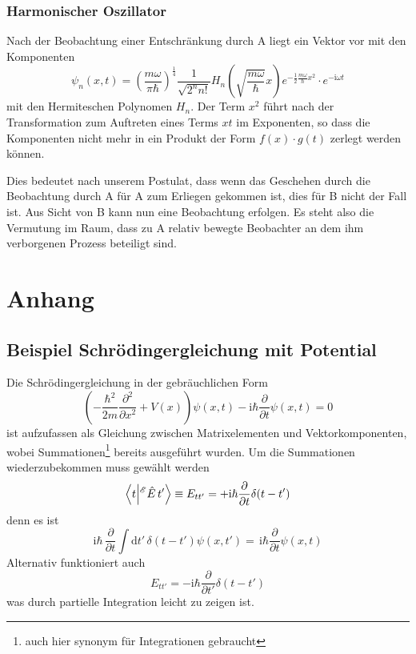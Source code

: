 \documentclass[12pt]{article}
\begin{document}
\subsubsection{Harmonischer Oszillator}

Nach der Beobachtung einer Entschränkung durch A liegt ein Vektor vor mit den Komponenten 
\begin{equation*}
\psi _{n}(x,t)=\left({\frac {m\omega }{\pi \hbar }}\right)^{\frac {1}{4}}{\frac {1}{\sqrt {2^{n}n!}}}H_{n}\left({\sqrt {\frac {m\omega }{\hbar }}}x\right)e^{-{\frac {1}{2}}{\frac {m\omega }{\hbar }}x^{2}} \cdot e^{-\mathrm{i}\omega t}
\end{equation*}
mit den Hermiteschen Polynomen $H_n$. Der Term $x^2$ führt nach der Transformation zum Auftreten eines Terms $xt$ im Exponenten, so dass die Komponenten nicht mehr in ein Produkt der Form $f(x) \cdot g(t)$ zerlegt werden können.

Dies bedeutet nach unserem Postulat, dass wenn das Geschehen durch die Beobachtung durch A für A zum Erliegen gekommen ist, dies für B nicht der Fall ist. Aus Sicht von B kann nun eine Beobachtung erfolgen. Es steht also die Vermutung im Raum, dass zu A relativ bewegte Beobachter an dem ihm verborgenen Prozess beteiligt sind.

\section{Anhang}
\subsection{Beispiel Schrödingergleichung mit Potential}
Die Schrödingergleichung in der gebräuchlichen Form 
\begin{equation*}
\left(-\frac {\hbar^2}{2m}\frac{\partial^2}{\partial x^2} +V(x)\right)\psi(x,t)
-\mathrm {i} \hbar \frac {\partial }{\partial t}\psi(x,t) = 0
\end{equation*} 
ist aufzufassen als Gleichung zwischen Matrixelementen und Vektorkomponenten, wobei Summationen\footnote{auch hier synonym für Integrationen gebraucht} bereits ausgeführt wurden. Um die Summationen wiederzubekommen muss gewählt werden
\begin{equation*}
\bra{t}\ket{^\mathscr{E}\hat{E}\,t'}\equiv E_{tt'} = 
+\mathrm {i} \hbar \frac{\partial }{\partial t}\delta(t-t')
\end{equation*} 
denn es ist 
\begin{equation*}
\mathrm{i}\hbar\,\frac{\partial }{\partial t} \int \mathrm{d}t'\,\delta(t-t') \psi (x ,t')
=\, \mathrm {i} \hbar \frac {\partial }{\partial t}\psi (x ,t)
\end{equation*}
Alternativ funktioniert auch
\begin{equation*}
E_{tt'} = - \mathrm {i} \hbar \frac{\partial }{\partial t'}\delta(t-t')
\end{equation*} 
was durch partielle Integration leicht zu zeigen ist.
\end{document}
